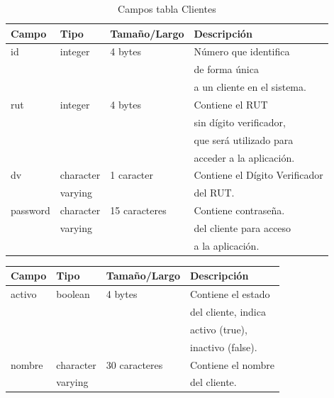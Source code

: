 \documentclass[letterpaper,12pt]{article}
\begin{document}
\begin{enumerate}
\begin{table}[!ht]
\caption{Campos tabla Clientes}
\begin{center}
\begin{tabular}{|l|l|l|l|}
\hline
\textbf{Campo} \hspace*{2cm} & \textbf{Tipo} & \textbf{Tamaño/Largo} & \textbf{Descripción} \hspace*{3,5cm} \\
\hline
id & integer & 4 bytes & Número que identifica\\ 
\mbox{} & \mbox{} & & de forma única \\
\mbox{} & \mbox{} & & a un cliente en el sistema.\\
\hline

rut & integer & 4 bytes & Contiene el RUT\\
\mbox{} & \mbox{} & & sin dígito verificador,\\
\mbox{} & \mbox{} & & que será utilizado para\\
\mbox{} & \mbox{} & & acceder a la aplicación.\\
\hline
dv & character & 1 caracter& Contiene el Dígito Verificador\\
\mbox{} & varying & & del RUT.\\
\hline

password & character & 15 caracteres & Contiene contraseña.\\
\mbox{} & varying & & del cliente para acceso\\
\mbox{} & \mbox{} & & a la aplicación.\\
\hline

\end{tabular}
\end{center}
\end{table}


\newpage
\begin{table}[!ht]
\begin{center}
\begin{tabular}{|l|l|l|l|}
\hline
\textbf{Campo} \hspace*{2cm} & \textbf{Tipo} & \textbf{Tamaño/Largo} & \textbf{Descripción} \hspace*{3,5cm} \\
\hline

activo & boolean & 4 bytes & Contiene el estado\\
\mbox{} & \mbox{} & & del cliente, indica\\
\mbox{} & \mbox{} & & activo (true), \\
\mbox{} & \mbox{} & & inactivo (false). \\
\hline
nombre & character & 30 caracteres & Contiene el nombre\\
\mbox{} & varying & & del cliente. \\


\end{tabular}
\end{center}
\end{table}
\end{enumerate}
\end{document}
